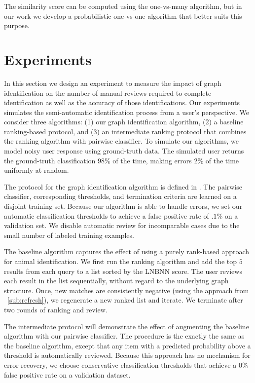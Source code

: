    The similarity score can be computed using the one-vs-many algorithm, but
      in our work we develop a probabilistic one-vs-one algorithm that better
      suits this purpose.

\section{Experiments}\label{sec:graphexpt}
    In this section we design an experiment to measure the impact of graph
      identification on the number of manual reviews required to complete
      identification as well as the accuracy of those identifications.
    Our experiments simulates the semi-automatic identification process from a
      user's perspective.
    We consider three algorithms:
    (1) our graph identification algorithm,
    (2) a baseline ranking-based protocol, and
    (3) an intermediate ranking protocol that combines the ranking algorithm
      with pairwise classifier.
    To simulate our algorithms, we model noisy user response using
      ground-truth data.
    The simulated user returns the ground-truth classification 98\% of the
    time, making errors 2\% of the time uniformly at random.

    The protocol for the graph identification algorithm is defined in
      .
    The pairwise classifier, corresponding thresholds, and termination
      criteria are learned on a disjoint training set.
    Because our algorithm is able to handle errors, we set our automatic
      classification thresholds to achieve a false positive rate of $.1\%$ 
    on a validation set.
    We disable automatic review for incomparable cases due to the small number
      of labeled training examples.

    The baseline algorithm captures the effect of using a purely rank-based
      approach for animal identification.
    We first run the ranking algorithm and add the top $5$ results from each
      query to a list sorted by the LNBNN score.
    The user reviews each result in the list sequentially, without regard to
      the underlying graph structure.
    Once, new matches are consistently negative (using the approach from
      ~\cref{sub:refresh}), we regenerate a new ranked list and iterate.
    We terminate after two rounds of ranking and review.

    The intermediate protocol will demonstrate the effect of augmenting the
      baseline algorithm with our pairwise classifier.
    The procedure is the exactly the same as the baseline algorithm, except
      that any item with a predicted probability above a threshold is
      automatically reviewed.
    Because this approach has no mechanism for error recovery, we choose
      conservative classification thresholds that achieve a $0\%$ false 
    positive rate on a validation dataset.

